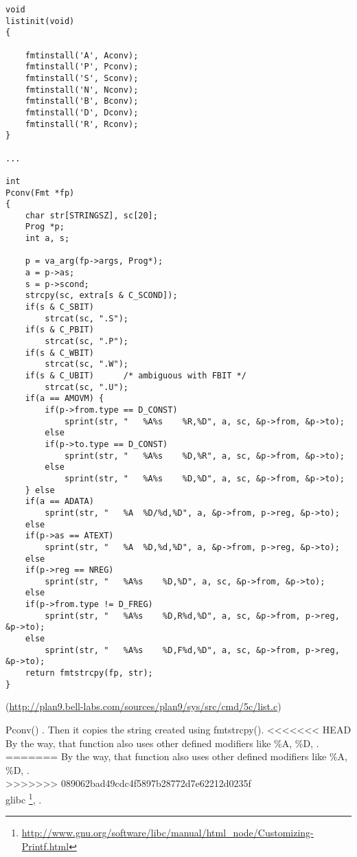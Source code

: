 \begin{lstlisting}[caption=go\textbackslash{}src\textbackslash{}cmd\textbackslash{}5c\textbackslash{}list.c]
void
listinit(void)
{

	fmtinstall('A', Aconv);
	fmtinstall('P', Pconv);
	fmtinstall('S', Sconv);
	fmtinstall('N', Nconv);
	fmtinstall('B', Bconv);
	fmtinstall('D', Dconv);
	fmtinstall('R', Rconv);
}

...

int
Pconv(Fmt *fp)
{
	char str[STRINGSZ], sc[20];
	Prog *p;
	int a, s;

	p = va_arg(fp->args, Prog*);
	a = p->as;
	s = p->scond;
	strcpy(sc, extra[s & C_SCOND]);
	if(s & C_SBIT)
		strcat(sc, ".S");
	if(s & C_PBIT)
		strcat(sc, ".P");
	if(s & C_WBIT)
		strcat(sc, ".W");
	if(s & C_UBIT)		/* ambiguous with FBIT */
		strcat(sc, ".U");
	if(a == AMOVM) {
		if(p->from.type == D_CONST)
			sprint(str, "	%A%s	%R,%D", a, sc, &p->from, &p->to);
		else
		if(p->to.type == D_CONST)
			sprint(str, "	%A%s	%D,%R", a, sc, &p->from, &p->to);
		else
			sprint(str, "	%A%s	%D,%D", a, sc, &p->from, &p->to);
	} else
	if(a == ADATA)
		sprint(str, "	%A	%D/%d,%D", a, &p->from, p->reg, &p->to);
	else
	if(p->as == ATEXT)
		sprint(str, "	%A	%D,%d,%D", a, &p->from, p->reg, &p->to);
	else
	if(p->reg == NREG)
		sprint(str, "	%A%s	%D,%D", a, sc, &p->from, &p->to);
	else
	if(p->from.type != D_FREG)
		sprint(str, "	%A%s	%D,R%d,%D", a, sc, &p->from, p->reg, &p->to);
	else
		sprint(str, "	%A%s	%D,F%d,%D", a, sc, &p->from, p->reg, &p->to);
	return fmtstrcpy(fp, str);
}
\end{lstlisting}
(\url{http://plan9.bell-labs.com/sources/plan9/sys/src/cmd/5c/list.c})

 Pconv() 
.
{Then it copies the string created using} fmtstrcpy().
<<<<<<< HEAD
{By the way, that function also uses other defined modifiers like} \%A, \%D, . \\
=======
{By the way, that function also uses other defined modifiers like} \%A, \%D, . \\
>>>>>>> 089062bad49cdc4f5897b28772d7e62212d0235f
\\
 \gls{glibc}
\footnote{\url{http://www.gnu.org/software/libc/manual/html_node/Customizing-Printf.html}}, 
 .

